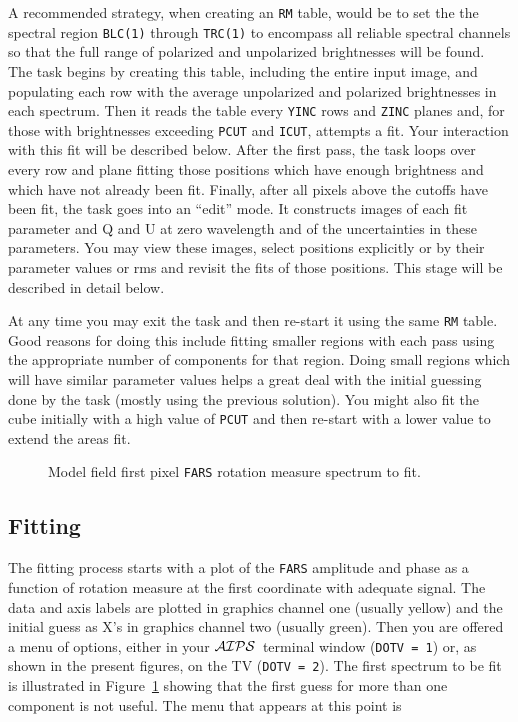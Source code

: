 \documentclass[twoside]{article}
\newcommand{\Hi}[1]{\textcolor{hicol}{#1}}
\newcommand{\AIPS}{{$\cal AIPS\/$}}
\newcommand{\putfig}[1]{\texttt{[image: \#1.eps]}}
\begin{document}
A recommended strategy, when creating an {\tt RM} table, would be to
set the \Hi{the spectral region {\tt BLC(1)} through {\tt TRC(1)} to
encompass all reliable spectral channels so that the full range of
polarized and unpolarized brightnesses will be found.}  The task
begins by creating this table\Hi{, including the entire input
image,} and populating each row with the average unpolarized and
polarized brightnesses in each spectrum.  Then it reads the table
every {\tt YINC} rows and {\tt ZINC} planes and, for those with
brightnesses exceeding {\tt PCUT} and {\tt ICUT}, attempts a fit.
Your interaction with this fit will be described below.  After the
first pass, the task loops over every row and plane fitting those
positions which have enough brightness and which have not already been
fit.  Finally, after all pixels above the cutoffs have been fit, the
task goes into an ``edit'' mode.  It constructs images of each fit
parameter and Q and U at zero wavelength and of the uncertainties in
these parameters.  You may view these images, select positions
explicitly or by their parameter values or rms and revisit the fits of
those positions.  This stage will be described in detail below.

At any time you may exit the task and then re-start it using the
same {\tt RM} table.  Good reasons for doing this include fitting
smaller regions with each pass using the appropriate number of
components for that region.  Doing small regions which will have
similar parameter values helps a great deal with the initial guessing
done by the task (mostly using the previous solution).  You might also
fit the cube initially with a high value of {\tt PCUT} and then
re-start with a lower value to extend the areas fit.

\begin{figure}
\begin{center}
\resizebox{6.0in}{!}{\putfig{RMFIT.init3}}
\caption{Model field first pixel {\tt FARS} rotation measure spectrum
  to fit.}
\label{fig:RMFIT.init}
\end{center}
\end{figure}

\subsection{Fitting}

The fitting process starts with a plot of the {\tt FARS} amplitude and
phase as a function of rotation measure at the first coordinate with
adequate signal.  The data and axis labels are plotted in graphics
channel one (usually yellow) and the initial guess as X's in graphics
channel two (usually green).  Then you are offered a menu of options,
either in your \AIPS\ terminal window ({\tt DOTV = 1}) or, as shown in
the present figures, on the TV ({\tt DOTV = 2}).  The first spectrum
to be fit is illustrated in Figure~\ref{fig:RMFIT.init} showing
that the first guess for more than one component is not useful.  The
menu that appears at this point is\\
\end{document}
